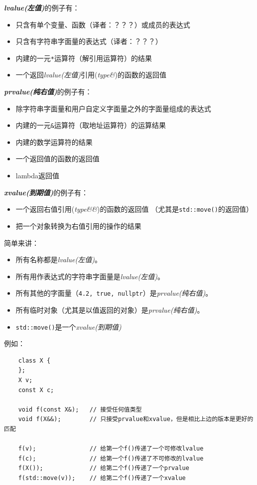 \emph{\textbf{lvalue(左值)}}的例子有：
\begin{itemize}[leftmargin=*]
    \item 只含有单个变量、函数（译者：？？？）或成员的表达式
    \item 只含有字符串字面量的表达式（译者：？？？）
    \item 内建的一元\texttt{*}运算符（解引用运算符）的结果
    \item 一个返回\emph{lvalue(左值)}引用(\emph{type\&})的函数的返回值
\end{itemize}
\emph{\textbf{prvalue(纯右值)}}的例子有：
\begin{itemize}[leftmargin=*]
    \item 除字符串字面量和用户自定义字面量之外的字面量组成的表达式
    \item 内建的一元\texttt{\&}运算符（取地址运算符）的运算结果
    \item 内建的数学运算符的结果
    \item 一个返回值的函数的返回值
    \item lambda返回值
\end{itemize}
\emph{\textbf{xvalue(到期值)}}的例子有：
\begin{itemize}[leftmargin=*]
    \item 一个返回右值引用(\emph{type\&\&})的函数的返回值
    （尤其是\texttt{std::move()}的返回值）
    \item 把一个对象转换为右值引用的操作的结果
\end{itemize}
简单来讲：
\begin{itemize}[leftmargin=*]
    \item 所有名称都是\emph{lvalue(左值)}。
    \item 所有用作表达式的字符串字面量是\emph{lvalue(左值)}。
    \item 所有其他的字面量（\texttt{4.2, true, nullptr}）是\emph{prvalue(纯右值)}。
    \item 所有临时对象（尤其是以值返回的对象）是\emph{prvalue(纯右值)}。
    \item \texttt{std::move()}是一个\emph{xvalue(到期值)}
\end{itemize}
例如：
\begin{lstlisting}
    class X {
    };
    X v;
    const X c;

    void f(const X&);   // 接受任何值类型
    void f(X&&);        // 只接受prvalue和xvalue，但是相比上边的版本是更好的匹配

    f(v);               // 给第一个f()传递了一个可修改lvalue
    f(c);               // 给第一个f()传递了不可修改的lvalue
    f(X());             // 给第二个f()传递了一个prvalue
    f(std::move(v));    // 给第二个f()传递了一个xvalue
\end{lstlisting}
